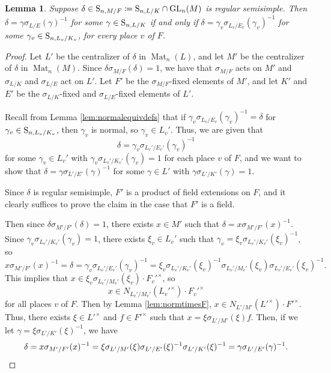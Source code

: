 \documentclass[11pt, reqno]{amsart}
\numberwithin{equation}{subsection}
\theoremstyle{plain}
\newtheorem{lem}[proposition]{Lemma}
\theoremstyle{definition}
\renewcommand{\S}{\textnormal{S}}
\DeclareMathOperator{\GL}{GL}
\DeclareMathOperator{\Mat}{Mat}
\begin{document}
\begin{lem}
\label{lem:localglobal}
Suppose $\delta \in \S_{n, M/F} \coloneqq
\S_{n,L/K} \cap \GL_n(M)$ is regular semisimple.
Then $\delta = \gamma\sigma_{L/E}(\gamma)^{-1}$
for some $\gamma \in \S_{n, L/K}$ if and only
if $\delta = \gamma_v\sigma_{L_v/E_v}(\gamma_v)^{-1}$
for some $\gamma_v \in \S_{n, L_v/K_v}$, for every
place $v$ of $F$.
\end{lem}
\begin{proof}
Let $L'$ be the centralizer of $\delta$ in
$\Mat_n(L)$, and let $M'$ be the centralizer of
$\delta$ in $\Mat_n(M)$. 
Since $\delta\sigma_{M/F}(\delta) = 1$, we have
that $\sigma_{M/F}$ acts on $M'$ and 
$\sigma_{L/K}$ and $\sigma_{L/E}$ act on $L'$. 
Let $F'$ be the
$\sigma_{M/F}$-fixed elements of $M'$, and let
$K'$ and $E'$ be the $\sigma_{L/K}$-fixed and
$\sigma_{L/E}$-fixed elements of $L'$.

Recall from Lemma \ref{lem:normalequivdefs} that
if $\gamma_v\sigma_{L_v/E_v}(\gamma_v)^{-1} =
\delta$ for $\gamma_v \in \S_{n, L_v/K_v}$, then
$\gamma_v$ is normal, so $\gamma_v \in L_v'$.
Thus, we are given that
\[
    \delta = \gamma_v\sigma_{L_v'/E_v'}(\gamma_v)^{-1}
\]
for some $\gamma_v \in L_v'$ with
$\gamma_v\sigma_{L_v'/K_v'}(\gamma_v) = 1$
for each place $v$ of $F$, and we want to show
that $\delta = \gamma\sigma_{L'/E'}(\gamma)^{-1}$
for some $\gamma \in L'$ with
$\gamma\sigma_{L'/K'}(\gamma) = 1$.

Since $\delta$ is regular semisimple, $F'$ is a product
of field extensions on $F$, and
it clearly suffices to prove the claim in the case 
that $F'$ is a field.

Then since $\delta\sigma_{M'/F'}(\delta) = 1$, there exists
$x \in M'$ such that $\delta = x\sigma_{M'/F'}(x)^{-1}$.
Since $\gamma_v\sigma_{L_v'/K_v'}(\gamma_v) = 1$, 
there exists $\xi_v \in L_v'$ such that
$\gamma_v = \xi_v\sigma_{L_v'/K_v'}(\xi_v)^{-1}$, so
\[
    x\sigma_{M'/F'}(x)^{-1} = \delta
    = \gamma_v\sigma_{L_v'/E_v'}(\gamma_v)^{-1}
    = \xi_v\sigma_{L_v'/K_v'}(\xi_v)^{-1}
    \sigma_{L_v'/M_v'}(\xi_v)\sigma_{L_v'/E_v'}(\xi_v)^{-1}.
\]
This implies that $x \in \xi_v\sigma_{L_v'/M_v'}(\xi_v)
\cdot F_v'^\times$, so 
\[ 
    x \in N_{L_v'/M_v'}(L_v'^\times) \cdot F_v'^\times
\]
for all places $v$ of $F$.
Then by Lemma \ref{lem:normtimesF},  
$x \in N_{L'/M'}(L'^\times) \cdot F'^\times$. 
Thus, there exists $\xi \in L'^\times$ and $f \in F'^\times$
such that $x = \xi\sigma_{L'/M'}(\xi) f$. 
Then, if we let $\gamma = \xi\sigma_{L'/K'}(\xi)^{-1}$,
we have
\[
    \delta = x\sigma_{M'/F'}(x)^{-1}
    = \xi\sigma_{L'/M'}(\xi)\sigma_{L'/E'}(\xi)^{-1}
    \sigma_{L'/K'}(\xi)^{-1}
    = \gamma\sigma_{L'/E'}(\gamma)^{-1}.
    \qedhere
\]
\end{proof}
\end{document}
